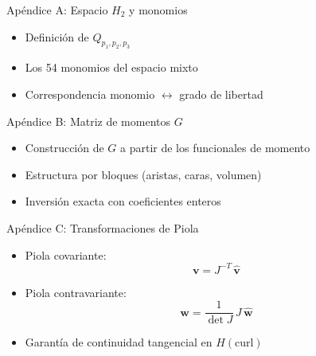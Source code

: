 \documentclass[aspectratio=169,11pt]{beamer}
\begin{document}
\appendix

\begin{frame}{Apéndice A: Espacio $H_2$ y monomios}
  \begin{itemize}
    \item Definición de $Q_{p_1,p_2,p_3}$
    \item Los 54 monomios del espacio mixto
    \item Correspondencia monomio $\leftrightarrow$ grado de libertad
  \end{itemize}
\end{frame}

\begin{frame}{Apéndice B: Matriz de momentos $G$}
  \begin{itemize}
    \item Construcción de $G$ a partir de los funcionales de momento
    \item Estructura por bloques (aristas, caras, volumen)
    \item Inversión exacta con coeficientes enteros
  \end{itemize}
\end{frame}

\begin{frame}{Apéndice C: Transformaciones de Piola}
  \begin{itemize}
    \item Piola covariante:
      \begin{equation*}
        \mathbf{v} = J^{-T}\, \hat{\mathbf{v}}
      \end{equation*}
    \item Piola contravariante:
      \begin{equation*}
        \mathbf{w} = \frac{1}{\det J}\, J\, \hat{\mathbf{w}}
      \end{equation*}
    \item Garantía de continuidad tangencial en $H(\mathrm{curl})$
  \end{itemize}
\end{frame}
\end{document}
